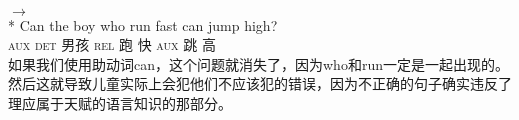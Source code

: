 \glt {}\\
$\to$\\
 {}* \gll Can the boy who run fast can jump high?\\
          \textsc{aux} \textsc{det} 男孩 \textsc{rel} 跑 快 \textsc{aux} 跳 高\\
\zl
如果我们使用助动词can，这个问题就消失了，因为who和run一定是一起出现的。然后这就导致儿童实际上会犯他们不应该犯的错误，因为不正确的句子确实违反了理应属于天赋的语言知识的那部分。

